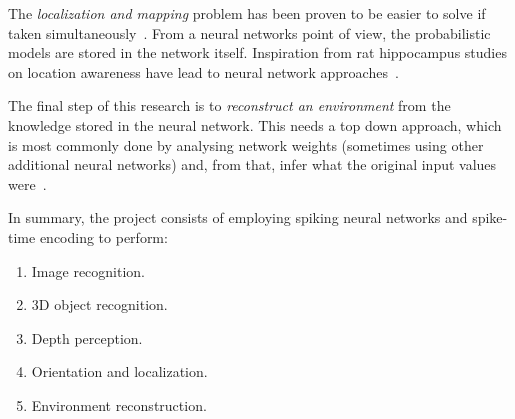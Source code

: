 The \emph{localization and mapping} problem has been proven to be easier to solve if taken simultaneously~\cite{Durrant-Whyte2006-slam,Fuentes-Pacheco2012-slam}. From a neural networks point of view, the probabilistic models are stored in the network itself. Inspiration from rat hippocampus studies on location awareness have lead to neural network approaches~\cite{Milford2004-ratslam}.

The final step of this research is to \emph{reconstruct an environment} from the knowledge stored in the neural network. This needs a top down approach, which is most commonly done by analysing network weights (sometimes using other additional neural networks) and, from that, infer what the original input values were~\cite{Anh-Dung-deconv-nets}. 


In summary, the project consists of employing spiking neural networks and spike-time encoding to perform:
\begin{enumerate}
  \item Image recognition.
  \item 3D object recognition.
  \item Depth perception.
  \item Orientation and localization.
  \item Environment reconstruction.
\end{enumerate}